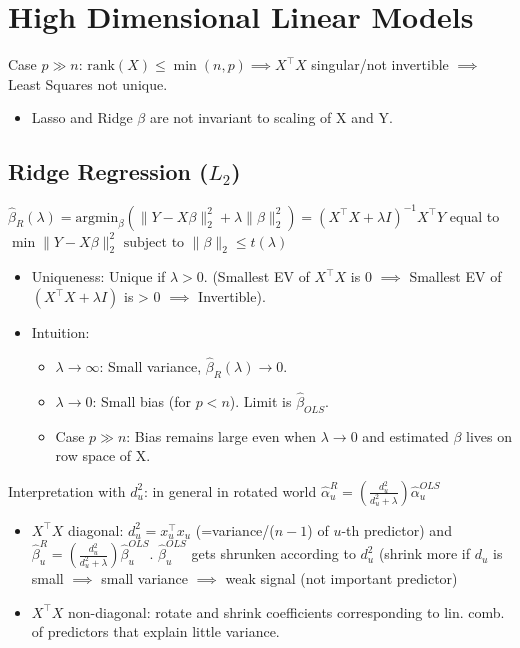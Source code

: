 \section{High Dimensional Linear Models}
Case $p \gg n$: $\text{rank}(X) \leq \min(n,p) \implies X^\top X$ singular/not invertible $\implies$ Least Squares not unique.

\begin{itemize}
    \item Lasso and Ridge $\beta$ are not invariant to scaling of X and Y.
\end{itemize}

\subsection{Ridge Regression ($L_2$)}
$ \hat{\beta}_R(\lambda) = \text{argmin}_\beta (\|Y - X\beta\|_2^2 + \lambda \|\beta\|_2^2) = (X^\top X + \lambda I)^{-1} X^\top Y $
equal to $\min \|Y - X\beta\|_2^2 \text{ subject to } \|\beta\|_2 \le t(\lambda)$
\begin{itemize}
    \item Uniqueness: Unique if $\lambda > 0$. (Smallest EV of $X^\top X$ is 0 $\implies$ Smallest EV of $(X^\top X + \lambda I)$ is > 0 $\implies$ Invertible).
    \item Intuition:
    \begin{itemize}
        \item $\lambda \to \infty$: Small variance, $\hat{\beta}_R(\lambda) \to 0$.
        \item $\lambda \to 0$: Small bias (for $p < n$). Limit is $\hat{\beta}_{OLS}$.
        \item Case $p \gg n$: Bias remains large even when $\lambda \to 0$ and estimated $\beta$ lives on row space of X.
    \end{itemize}
\end{itemize}

Interpretation with $d_u^2$: in general in rotated world
$ \hat{\alpha}_u^R = \left( \frac{d_u^2}{d_u^2 + \lambda} \right) \hat{\alpha}_u^{OLS} $
\begin{itemize}
    \item $X^\top X$ diagonal:  $d_u^2 = x_u^\top x_u$ (=variance/($n-1$) of $u$-th predictor) and $ \hat{\beta}_u^R = \left( \frac{d_u^2}{d_u^2 + \lambda} \right) \hat{\beta}_u^{OLS} $. $\hat{\beta}_u^{OLS}$ gets shrunken according to $d_u^2$ (shrink more if $d_u$ is small $\implies$ small variance $\implies$ weak signal (not important predictor)
    \item $X^\top X$ non-diagonal: rotate and shrink coefficients corresponding to lin. comb. of predictors that explain little variance.
\end{itemize}

